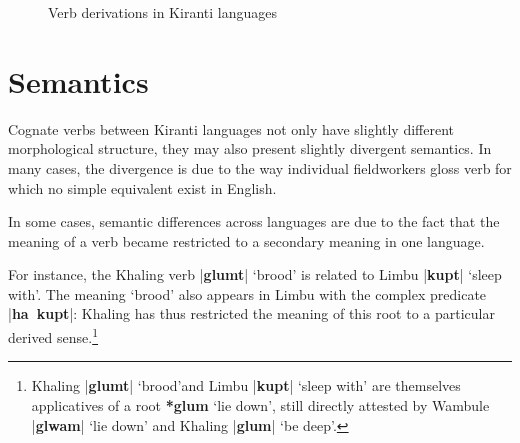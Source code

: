 \documentclass[oldfontcommands,oneside,a4paper,11pt]{article}
\newcommand{\ipa}[1]{\textbf{{\phon\mbox{#1}}}} %
\newcommand{\dhatu}[2]{|\ipa{#1}| `#2'}
\newcommand{\dhat}[1]{|\ipa{#1}|}
\begin{document}
   \begin{figure}[H]
   \caption{Verb derivations in Kiranti languages} \label{fig:kiranti.derivations}  
\end{figure}

\section{Semantics} \label{sec:semantic}
Cognate verbs between Kiranti languages not only have slightly different morphological structure, they may also present slightly divergent semantics. In many cases, the divergence is due to the way individual fieldworkers gloss verb for which no simple equivalent exist in English.

In some cases, semantic differences across languages are due to the fact that the meaning of a verb became restricted to a secondary meaning in one language. 

For instance, the Khaling verb \dhatu{glumt}{brood} is related to Limbu \dhatu{kupt}{sleep with}. The meaning `brood' also appears in Limbu with the complex predicate \dhat{ha kupt}: Khaling has thus restricted the meaning of this root to a particular derived sense.\footnote{Khaling \dhatu{glumt}{brood}and Limbu  \dhatu{kupt}{sleep with} are themselves applicatives of a root \ipa{*glum} `lie down', still directly attested by Wambule  \dhatu{glwam}{lie down} and Khaling \dhatu{glum}{be deep}.  }
\end{document}

